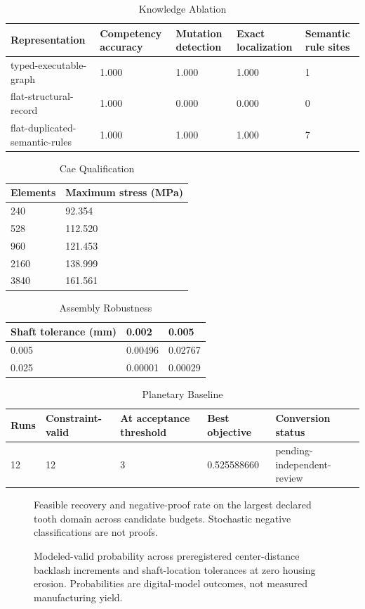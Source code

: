 \documentclass[preprint,12pt]{elsarticle}
\begin{document}
\begin{table}[htbp]
\centering
\caption{Knowledge Ablation}
\small
\begin{tabular}{lllll}
\textbf{Representation} & \textbf{Competency accuracy} & \textbf{Mutation detection} & \textbf{Exact localization} & \textbf{Semantic rule sites} \\
\hline
typed-executable-graph & 1.000 & 1.000 & 1.000 & 1 \\
flat-structural-record & 1.000 & 0.000 & 0.000 & 0 \\
flat-duplicated-semantic-rules & 1.000 & 1.000 & 1.000 & 7 \\
\end{tabular}
\end{table}
\begin{table}[htbp]
\centering
\caption{Cae Qualification}
\small
\begin{tabular}{ll}
\textbf{Elements} & \textbf{Maximum stress (MPa)} \\
\hline
240 & 92.354 \\
528 & 112.520 \\
960 & 121.453 \\
2160 & 138.999 \\
3840 & 161.561 \\
\end{tabular}
\end{table}
\begin{table}[htbp]
\centering
\caption{Assembly Robustness}
\small
\begin{tabular}{lll}
\textbf{Shaft tolerance (mm)} & \textbf{0.002} & \textbf{0.005} \\
\hline
0.005 & 0.00496 & 0.02767 \\
0.025 & 0.00001 & 0.00029 \\
\end{tabular}
\end{table}
\begin{table}[htbp]
\centering
\caption{Planetary Baseline}
\small
\begin{tabular}{lllll}
\textbf{Runs} & \textbf{Constraint-valid} & \textbf{At acceptance threshold} & \textbf{Best objective} & \textbf{Conversion status} \\
\hline
12 & 12 & 3 & 0.525588660 & pending-independent-review \\
\end{tabular}
\end{table}
\begin{figure}[htbp]
\centering

\caption{Feasible recovery and negative-proof rate on the largest declared tooth domain across candidate budgets. Stochastic negative classifications are not proofs.}
\end{figure}
\begin{figure}[htbp]
\centering

\caption{Modeled-valid probability across preregistered center-distance backlash increments and shaft-location tolerances at zero housing erosion. Probabilities are digital-model outcomes, not measured manufacturing yield.}
\end{figure}
\end{document}
